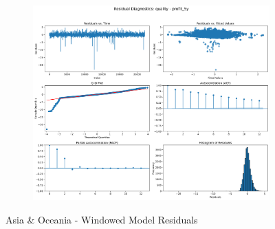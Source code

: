 \documentclass[11pt,english,a4paper,hidelinks]{book}
\begin{document}
\begin{figure}[H]
\begin{subfigure}[b]{0.32\textwidth}
    \end{subfigure}
    \hfill
    \begin{subfigure}[b]{0.32\textwidth}
        \centering
        \includegraphics[width=\textwidth]{images/code/models/linear_regression/third_model/AS/quality_profit_5y_residuals.png}
    \end{subfigure}
    \caption{Asia \& Oceania - Windowed Model Residuals}
    \label{fig:linear_regression_AS_residues_windowed}
\end{figure}
\end{document}
